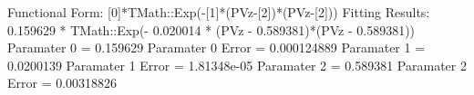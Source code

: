Functional Form: [0]*TMath::Exp(-[1]*(PVz-[2])*(PVz-[2]))
Fitting Results: 0.159629 * TMath::Exp(- 0.020014 * (PVz - 0.589381)*(PVz - 0.589381))
Paramater 0 = 0.159629
Paramater 0 Error = 0.000124889
Paramater 1 = 0.0200139
Paramater 1 Error = 1.81348e-05
Paramater 2 = 0.589381
Paramater 2 Error = 0.00318826
